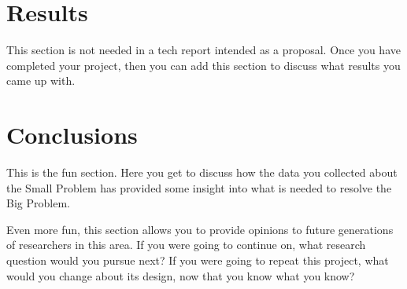 \documentclass[english]{proposalnsf}
\begin{document}
\section{Results}
\label{results}

This section is not needed in a tech report intended as a proposal.  Once you have completed your project, then you can add this section to discuss what results you came up with.

\section{Conclusions}
\label{conclusions}

This is the fun section. Here you get to discuss how the data you collected about the Small Problem has provided some insight into what is needed to resolve the Big Problem.

Even more fun, this section allows you to provide opinions to future generations of researchers in this area. If you were going to continue on, what research question would you pursue next?  If you were going to repeat this project, what would you change about its design, now that you know what you know?


\newpage


\end{document}
